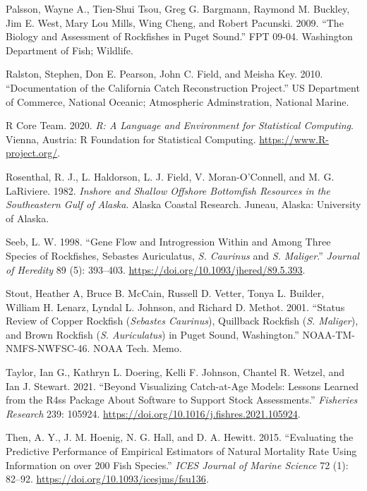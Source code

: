 \documentclass[11pt,
  english,
  a4paper,
]{article}
\begin{document}
\leavevmode\hypertarget{ref-Palssonetal_2009}{}%
Palsson, Wayne A., Tien-Shui Tsou, Greg G. Bargmann, Raymond M. Buckley, Jim E. West, Mary Lou Mills, Wing Cheng, and Robert Pacunski. 2009. ``The Biology and Assessment of Rockfishes in Puget Sound.'' FPT 09-04. Washington Department of Fish; Wildlife.

\leavevmode\hypertarget{ref-ralston_documentation_2010}{}%
Ralston, Stephen, Don E. Pearson, John C. Field, and Meisha Key. 2010. ``Documentation of the California Catch Reconstruction Project.'' US Department of Commerce, National Oceanic; Atmospheric Adminstration, National Marine.

\leavevmode\hypertarget{ref-R_2020}{}%
R Core Team. 2020. \emph{R: A Language and Environment for Statistical Computing}. Vienna, Austria: R Foundation for Statistical Computing. \url{https://www.R-project.org/}.

\leavevmode\hypertarget{ref-Rosenthaletal_maturity_1982}{}%
Rosenthal, R. J., L. Haldorson, L. J. Field, V. Moran-O'Connell, and M. G. LaRiviere. 1982. \emph{Inshore and Shallow Offshore Bottomfish Resources in the Southeastern Gulf of Alaska}. Alaska Coastal Research. Juneau, Alaska: University of Alaska.

\leavevmode\hypertarget{ref-seeb_gene_1998}{}%
Seeb, L. W. 1998. ``Gene Flow and Introgression Within and Among Three Species of Rockfishes, Sebastes Auriculatus, \emph{S. Caurinus} and \emph{S. Maliger}.'' \emph{Journal of Heredity} 89 (5): 393--403. \url{https://doi.org/10.1093/jhered/89.5.393}.

\leavevmode\hypertarget{ref-Stoutetal_DPS_2001}{}%
Stout, Heather A, Bruce B. McCain, Russell D. Vetter, Tonya L. Builder, William H. Lenarz, Lyndal L. Johnson, and Richard D. Methot. 2001. ``Status Review of Copper Rockfish (\emph{Sebastes Caurinus}), Quillback Rockfish (\emph{S. Maliger}), and Brown Rockfish (\emph{S. Auriculatus}) in Puget Sound, Washington.'' NOAA-TM-NMFS-NWFSC-46. NOAA Tech. Memo.

\leavevmode\hypertarget{ref-r4ss_2021}{}%
Taylor, Ian G., Kathryn L. Doering, Kelli F. Johnson, Chantel R. Wetzel, and Ian J. Stewart. 2021. ``Beyond Visualizing Catch-at-Age Models: Lessons Learned from the R4ss Package About Software to Support Stock Assessments.'' \emph{Fisheries Research} 239: 105924. \url{https://doi.org/10.1016/j.fishres.2021.105924}.

\leavevmode\hypertarget{ref-then_evaluating_2015-1}{}%
Then, A. Y., J. M. Hoenig, N. G. Hall, and D. A. Hewitt. 2015. ``Evaluating the Predictive Performance of Empirical Estimators of Natural Mortality Rate Using Information on over 200 Fish Species.'' \emph{ICES Journal of Marine Science} 72 (1): 82--92. \url{https://doi.org/10.1093/icesjms/fsu136}.
\end{document}
